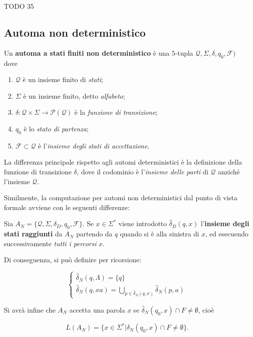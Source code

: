 \documentclass[10pt]{\classname}
\begin{document}
TODO 35

\subsection{Automa non deterministico}

Un \textbf{automa a stati finiti non deterministico} è una $5$-tupla $\mathcal Q, \Sigma, \delta, q_0,
\mathcal F)$ dove 
\begin{enumerate}
    \item $\mathcal Q$ è un insieme finito di \emph{stati};
    \item $\Sigma$ è un insieme finito, detto \emph{alfabeto};
    \item $\delta : \mathcal Q \times \Sigma \rightarrow \mathcal P(\mathcal Q)$ è la
        \emph{funzione di transizione};
    \item $q_0$ è lo \emph{stato di partenza};
    \item $\mathcal F \subset \mathcal Q$ è l'\emph{insieme degli stati
        di accettazione}.
\end{enumerate}

La differenza principale rispetto agli automi deterministici è la definizione
della funzione di transizione $\delta$, dove il codominio è l'\emph{insieme
delle parti} di $\mathcal Q$ anziché l'insieme $\mathcal Q$.

Similmente, la computazione per automi non deterministici dal punto di vista
formale avviene con le seguenti differenze:

Sia $A_N = \{ \mathcal Q, \Sigma, \delta_D, q_0, \mathcal F\}$. Se $x\in
\Sigma^*$ viene introdotto $\hat\delta_D (q, x)$ l'\textbf{insieme degli stati
raggiunti} da $A_N$ partendo da $q$ quando si è alla sinistra di $x$, ed
esecuendo successivamente \emph{tutti i percorsi} $x$.

Di conseguenza, si può definire per ricorsione:

$$
\left\{
    \begin{array}{l}
        \hat\delta_N (q, \Lambda) = \{q\} \\
        \hat\delta_N (q, xa) = \bigcup_{p \in \hat\delta_N(q, x)} \hat\delta_N (p, a)
    \end{array}
\right.
$$

Si avrà infine che $A_N$ accetta una parola $x$ se $\hat\delta_N(q_0, x) \cap F
\neq \emptyset$, cioè

$$L(A_N) = \{x \in \Sigma^* | \hat \delta_N(q_0, x) \cap F \neq \emptyset \}.$$
\end{document}
